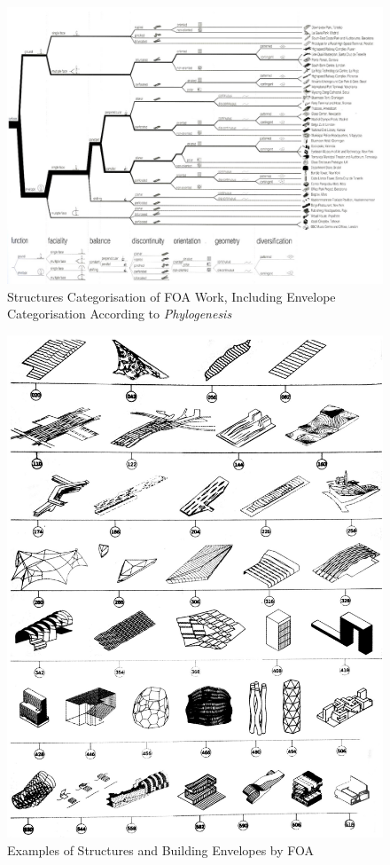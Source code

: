 \begin{figure}
	\centering
	\includegraphics[width=20cm]{./Images/1-Phylogenesis}
	\caption[FOA Phylogenesis]{Structures Categorisation of FOA Work, Including Envelope Categorisation According to \emph{Phylogenesis} \cite{foa04}}
	\label{fig:Phylogenesis}
\end{figure}

\begin{figure}[H]
	\centering
	\includegraphics[width=\textwidth]{./Images/2-Envelopes}
	\caption[FOA Building Envelopes]{Examples of Structures and Building Envelopes by FOA \cite{foa04}}
	\label{fig:FOAEnvelopes}
\end{figure}


